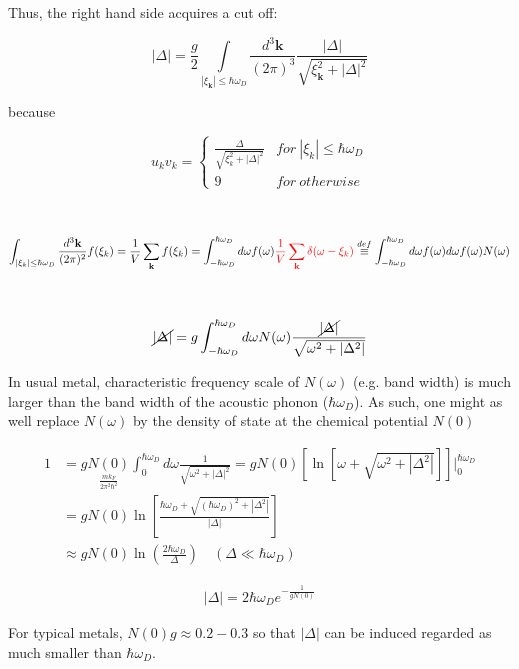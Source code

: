 Thus, the right hand side acquires a cut off:

\[|\Delta|=\frac{g}{2}\underset{|\xi_{\bm{k}}|\le\hbar\omega_D}{\int}\frac{d^3 \bm{k}}{(2\pi)^3}\frac{|\Delta|}{\sqrt{\xi_{\bm{k}}^2+|\Delta|^2}} \]

because

\[u_k v_k = \begin{cases}
\frac{\Delta}{\sqrt{\xi_k^2+|\Delta|^2}} & for\ |\xi_k|\le\hbar\omega_D\\
9 & for\ otherwise
\end{cases} \]

\dotfill

\ 

\[\int_{|\xi_k|\le\hbar\omega_D}\frac{d^3{\bf k}}{(2\pi)^2}f(\xi_k) = \frac{1}{V}\sum_{\bf k}f(\xi_k) = \int_{-\hbar\omega_D}^{\hbar\omega_D}d\omega f(\omega) {\color{red}{\frac{1}{V}\sum_{\bf k}\delta(\omega-\xi_k)}} \overset{def}{\equiv}\int_{-\hbar\omega_D}^{\hbar\omega_D}d\omega f(\omega) d\omega f(\omega)N(\omega) \]

\dotfill

\ 

\[\cancel{|\Delta|} = g\int_{-\hbar\omega_D}^{\hbar\omega_D}d\omega N(\omega)\frac{\cancel{|\Delta|}}{\sqrt{\omega^2+|\Delta^2|}} \]

In usual metal, characteristic frequency scale of $N(\omega)$ (e.g. band width) is much larger than the band width of the acoustic phonon ($\hbar\omega_D$). As such, one might as well replace $N(\omega)$ by the density of state at the chemical potential $N(0)$

\[\begin{split}
1 &= g\underset{\frac{mk_F}{2\pi^2\hbar^2}}{N(0)}\int_0^{\hbar\omega_D} d\omega\frac{1}{\sqrt{\omega^2+|\Delta|^2}} = gN(0)\left[\ln[\omega+\sqrt{\omega^2+|\Delta^2|}]\right]\Big|_0^{\hbar\omega_D}\\
&=gN(0)\ln\left[\frac{\hbar\omega_D+\sqrt{(\hbar\omega_D)^2+|\Delta^2|}}{|\Delta|}\right]\\
&\approx gN(0)\ln\left(\frac{2\hbar\omega_D}{\Delta}\right)\quad (\Delta\ll\hbar\omega_D)
\end{split} \]

\begin{align}\tag{B}\label{eq6B}
|\Delta| = 2\hbar\omega_De^{-\frac{1}{gN(0)}}
\end{align}

For typical metals, $N(0)g\approx0.2-0.3$ so that $|\Delta|$ can be induced regarded as much smaller than $\hbar\omega_D$. 

